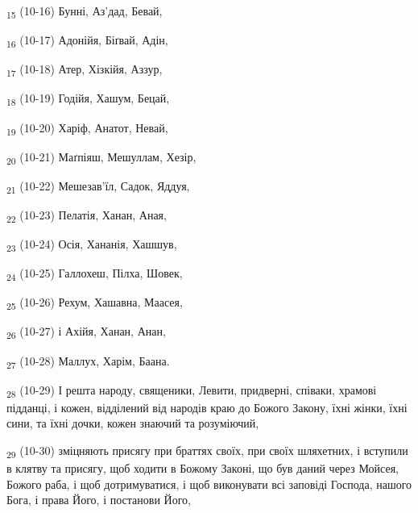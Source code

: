 \begin{tcolorbox}
\textsubscript{15} (10-16) Бунні, Аз'дад, Бевай,
\end{tcolorbox}
\begin{tcolorbox}
\textsubscript{16} (10-17) Адонійя, Біґвай, Адін,
\end{tcolorbox}
\begin{tcolorbox}
\textsubscript{17} (10-18) Атер, Хізкійя, Аззур,
\end{tcolorbox}
\begin{tcolorbox}
\textsubscript{18} (10-19) Годійя, Хашум, Бецай,
\end{tcolorbox}
\begin{tcolorbox}
\textsubscript{19} (10-20) Харіф, Анатот, Невай,
\end{tcolorbox}
\begin{tcolorbox}
\textsubscript{20} (10-21) Маґпіяш, Мешуллам, Хезір,
\end{tcolorbox}
\begin{tcolorbox}
\textsubscript{21} (10-22) Мешезав'їл, Садок, Яддуя,
\end{tcolorbox}
\begin{tcolorbox}
\textsubscript{22} (10-23) Пелатія, Ханан, Аная,
\end{tcolorbox}
\begin{tcolorbox}
\textsubscript{23} (10-24) Осія, Хананія, Хашшув,
\end{tcolorbox}
\begin{tcolorbox}
\textsubscript{24} (10-25) Галлохеш, Пілха, Шовек,
\end{tcolorbox}
\begin{tcolorbox}
\textsubscript{25} (10-26) Рехум, Хашавна, Маасея,
\end{tcolorbox}
\begin{tcolorbox}
\textsubscript{26} (10-27) і Ахійя, Ханан, Анан,
\end{tcolorbox}
\begin{tcolorbox}
\textsubscript{27} (10-28) Маллух, Харім, Баана.
\end{tcolorbox}
\begin{tcolorbox}
\textsubscript{28} (10-29) І решта народу, священики, Левити, придверні, співаки, храмові підданці, і кожен, відділений від народів краю до Божого Закону, їхні жінки, їхні сини, та їхні дочки, кожен знаючий та розуміючий,
\end{tcolorbox}
\begin{tcolorbox}
\textsubscript{29} (10-30) зміцняють присягу при браттях своїх, при своїх шляхетних, і вступили в клятву та присягу, щоб ходити в Божому Законі, що був даний через Мойсея, Божого раба, і щоб дотримуватися, і щоб виконувати всі заповіді Господа, нашого Бога, і права Його, і постанови Його,
\end{tcolorbox}
